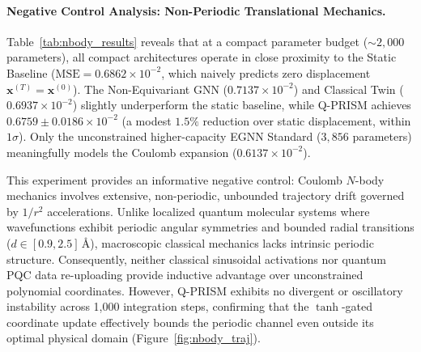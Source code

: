 \documentclass[10pt,twocolumn,letterpaper]{article}
\begin{document}
\begin{table}[h]
\centering
\small
\setlength{\tabcolsep}{4pt}
\caption{\textbf{3D Charged N-Body Trajectory Forecasting} ($N=1{,}000$, Mean $\pm$ Std across 5 Seeds: $42, 43, 44, 45, 46$).}
\label{tab:nbody_results}
\end{table}

\paragraph{Negative Control Analysis: Non-Periodic Translational Mechanics.}
Table~\ref{tab:nbody_results} reveals that at a compact parameter budget ($\sim 2{,}000$ parameters), all compact architectures operate in close proximity to the Static Baseline ($\text{MSE} = 0.6862 \times 10^{-2}$, which naively predicts zero displacement $\mathbf{x}^{(T)} = \mathbf{x}^{(0)}$). The Non-Equivariant GNN ($0.7137 \times 10^{-2}$) and Classical Twin ($0.6937 \times 10^{-2}$) slightly underperform the static baseline, while Q-PRISM achieves $0.6759 \pm 0.0186 \times 10^{-2}$ (a modest $1.5\%$ reduction over static displacement, within $1\sigma$). Only the unconstrained higher-capacity EGNN Standard ($3{,}856$ parameters) meaningfully models the Coulomb expansion ($0.6137 \times 10^{-2}$).

This experiment provides an informative negative control: Coulomb $N$-body mechanics involves extensive, non-periodic, unbounded trajectory drift governed by $1/r^2$ accelerations. Unlike localized quantum molecular systems where wavefunctions exhibit periodic angular symmetries and bounded radial transitions ($d \in [0.9, 2.5]$\,\AA), macroscopic classical mechanics lacks intrinsic periodic structure. Consequently, neither classical sinusoidal activations nor quantum PQC data re-uploading provide inductive advantage over unconstrained polynomial coordinates. However, Q-PRISM exhibits no divergent or oscillatory instability across 1{,}000 integration steps, confirming that the $\tanh$-gated coordinate update effectively bounds the periodic channel even outside its optimal physical domain (Figure~\ref{fig:nbody_traj}).
\end{document}
